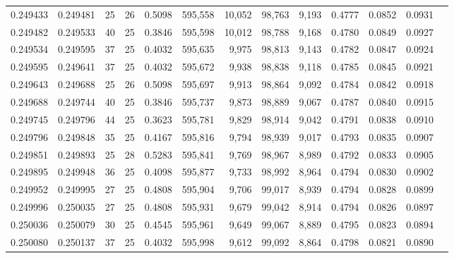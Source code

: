 \begin{tabular}{rrrrrrrrrrrrr}
0.249433 & 0.249481 &    25 &  26 &                                     0.5098 & 595,558 &  10,052 &  98,763 &   9,193 & 0.4777 & 0.0852 & 0.0931 \\
0.249482 & 0.249533 &    40 &  25 &                                     0.3846 & 595,598 &  10,012 &  98,788 &   9,168 & 0.4780 & 0.0849 & 0.0927 \\
0.249534 & 0.249595 &    37 &  25 &                                     0.4032 & 595,635 &   9,975 &  98,813 &   9,143 & 0.4782 & 0.0847 & 0.0924 \\
0.249595 & 0.249641 &    37 &  25 &                                     0.4032 & 595,672 &   9,938 &  98,838 &   9,118 & 0.4785 & 0.0845 & 0.0921 \\
0.249643 & 0.249688 &    25 &  26 &                                     0.5098 & 595,697 &   9,913 &  98,864 &   9,092 & 0.4784 & 0.0842 & 0.0918 \\
0.249688 & 0.249744 &    40 &  25 &                                     0.3846 & 595,737 &   9,873 &  98,889 &   9,067 & 0.4787 & 0.0840 & 0.0915 \\
0.249745 & 0.249796 &    44 &  25 &                                     0.3623 & 595,781 &   9,829 &  98,914 &   9,042 & 0.4791 & 0.0838 & 0.0910 \\
0.249796 & 0.249848 &    35 &  25 &                                     0.4167 & 595,816 &   9,794 &  98,939 &   9,017 & 0.4793 & 0.0835 & 0.0907 \\
0.249851 & 0.249893 &    25 &  28 &                                     0.5283 & 595,841 &   9,769 &  98,967 &   8,989 & 0.4792 & 0.0833 & 0.0905 \\
0.249895 & 0.249948 &    36 &  25 &                                     0.4098 & 595,877 &   9,733 &  98,992 &   8,964 & 0.4794 & 0.0830 & 0.0902 \\
0.249952 & 0.249995 &    27 &  25 &                                     0.4808 & 595,904 &   9,706 &  99,017 &   8,939 & 0.4794 & 0.0828 & 0.0899 \\
0.249996 & 0.250035 &    27 &  25 &                                     0.4808 & 595,931 &   9,679 &  99,042 &   8,914 & 0.4794 & 0.0826 & 0.0897 \\
0.250036 & 0.250079 &    30 &  25 &                                     0.4545 & 595,961 &   9,649 &  99,067 &   8,889 & 0.4795 & 0.0823 & 0.0894 \\
0.250080 & 0.250137 &    37 &  25 &                                     0.4032 & 595,998 &   9,612 &  99,092 &   8,864 & 0.4798 & 0.0821 & 0.0890 \\

\end{tabular}
